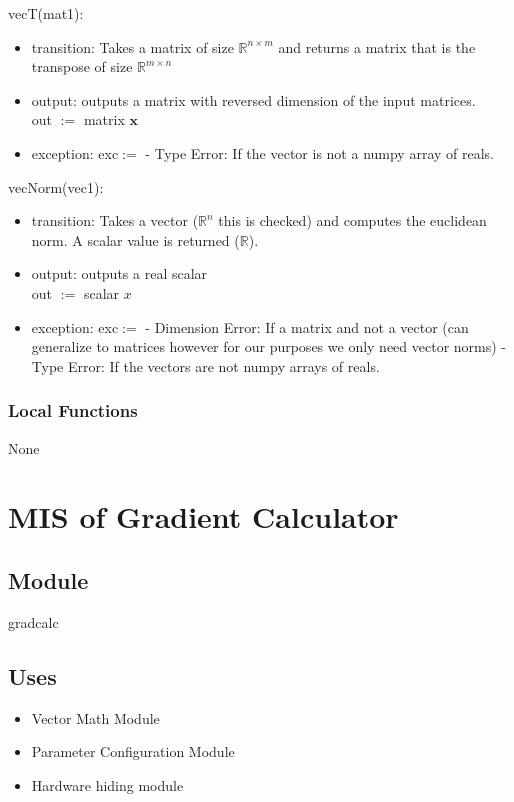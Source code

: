 \documentclass[12pt, titlepage]{article}
\begin{document}
vecT(mat1):
\begin{itemize}
\item transition: Takes a matrix of size $\mathbb{R}^{n \times m}$ and returns a matrix that is the transpose of size $\mathbb{R}^{m \times n}$
\item output: outputs a matrix with reversed dimension of the input matrices.
\\
out $:=$ matrix $\mathbf{x}$
\item exception: exc$:=$
\subitem - Type Error: If the vector is not a numpy array of reals.
\end{itemize}
vecNorm(vec1):
\begin{itemize}
\item transition: Takes a vector ($\mathbb{R}^{n}$ this is checked) and computes the euclidean norm. A scalar value is returned ($\mathbb{R}$).
\item output: outputs a real scalar
\\
out $:=$ scalar $x$
\item exception: exc$:=$
\subitem -  Dimension Error: If a matrix and not a vector (can generalize to matrices however for our purposes we only need vector norms)
\subitem - Type Error: If the vectors are not numpy arrays of reals.
\end{itemize}

\subsubsection{Local Functions}

None

\section{MIS of Gradient Calculator}\label{Module:GradCalc}

\subsection{Module}
gradcalc

\subsection{Uses}
\begin{itemize}
    \item Vector Math Module
    \item Parameter Configuration Module
\end{itemize}
\begin{itemize}
    \item Hardware hiding module
\end{itemize}
\end{document}
